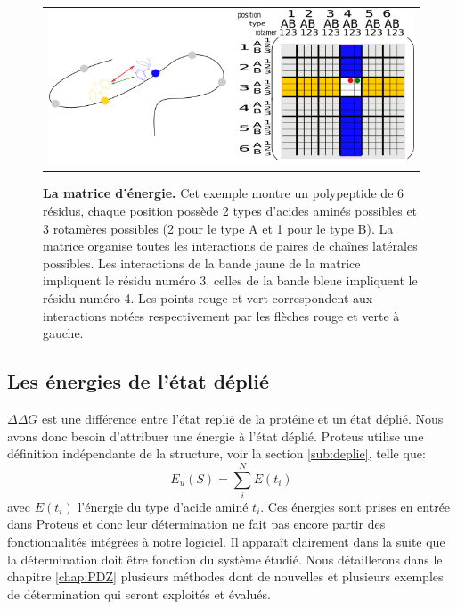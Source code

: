    \begin{figure}[!htbp]
     \centering
     \begin{tabular}{c}
       \includegraphics[width=15cm]{figure/matrice.png}
       \label{Graph:mat_ener}
     \end{tabular}
     
     \caption{\textbf{La matrice d'énergie.} Cet exemple montre un polypeptide de 6 résidus, chaque position possède 2 types d'acides aminés possibles et 3 rotamères possibles (2 pour le type A et 1 pour le type B). La matrice organise toutes les interactions de paires de chaînes latérales possibles. Les interactions de la bande jaune de la matrice impliquent le résidu numéro 3, celles de la bande bleue impliquent le résidu numéro 4. Les points rouge et vert correspondent aux interactions notées respectivement par les flèches rouge et verte à gauche.}
\label{fig:matener}
   \end{figure}
   

\subsection{Les énergies de l'état déplié}

$\Delta \Delta G$ est une différence entre l'état replié de la protéine et un état déplié. Nous avons donc besoin d'attribuer une énergie à l'état déplié. Proteus utilise une définition indépendante de la structure, voir la section \vref{sub:deplie}, telle que:
\begin{equation}
E_u(S) = \sum_i^N E(t_i)  
\end{equation}
avec $E(t_i)$ l'énergie du type d'acide aminé $t_i$. Ces énergies sont prises en entrée dans Proteus et donc leur détermination ne fait pas encore partir des fonctionnalités intégrées à notre logiciel. Il apparaît clairement dans la suite que la détermination doit être fonction du système étudié. Nous détaillerons dans le chapitre \ref{chap:PDZ} plusieurs méthodes dont de nouvelles et plusieurs exemples de détermination qui seront exploités et évalués.

